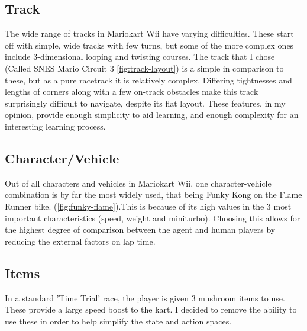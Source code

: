 \subsection{Track}
The wide range of tracks in Mariokart Wii have varying difficulties. These start off with simple, wide tracks with few turns, but some of the more complex ones include 3-dimensional looping and twisting courses. The track that I chose (Called SNES Mario Circuit 3 \ref{fig:track-layout}) is a simple in comparison to these, but as a pure racetrack it is relatively complex. Differing tightnesses and lengths of corners along with a few on-track obstacles make this track surprisingly difficult to navigate, despite its flat layout. These features, in my opinion, provide enough simplicity to aid learning, and enough complexity for an interesting learning process.
\subsection{Character/Vehicle}
Out of all characters and vehicles in Mariokart Wii, one character-vehicle combination is by far the most widely used, that being Funky Kong on the Flame Runner bike. (\ref{fig:funky-flame}).This is because of its high values in the 3 most important characteristics (speed, weight and miniturbo). Choosing this allows for the highest degree of comparison between the agent and human players by reducing the external factors on lap time.
\subsection{Items}
In a standard 'Time Trial' race, the player is given 3 mushroom items to use. These provide a large speed boost to the kart. I decided to remove the ability to use these in order to help simplify the state and action spaces. 

